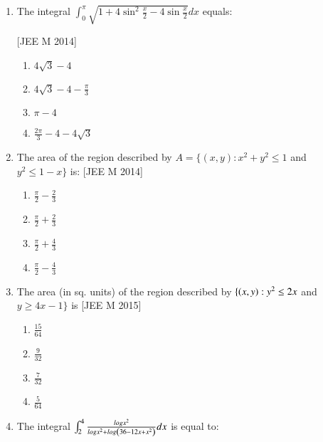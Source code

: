 \documentclass[journal,12pt,twocolumn]{IEEEtran}
\theoremstyle{remark}
\begin{document}
\begin{enumerate}[label=\textcolor{black}{\arabic*.}]

	\item The integral $\int_0^{\pi}\sqrt{1+4\sin ^2\frac{x}{2}-4\sin \frac{x}{2}}dx$ equals:

		\hfill{[JEE M 2014]}

		\begin{multicols}{2}
			\begin{enumerate}[label=(\alph*)]
				\item $4\sqrt{3}-4$
				\item $4\sqrt{3}-4-\frac{\pi}{3}$
				\item $\pi-4$
				\item $\frac{2\pi}{3}-4-4\sqrt{3}$
			\end{enumerate}
		\end{multicols}


	\item The area of the region described by $A=\{(x,y):x^2+y^2\leq1$ and $y^2\leq1-x\}$ is:
		\hfill{[JEE M 2014]}

		\begin{multicols}{4}
			\begin{enumerate}[label=(\alph*)]
				\item $\frac{\pi}{2}-\frac{2}{3}$
				\item $\frac{\pi}{2}+\frac{2}{3}$
				\item $\frac{\pi}{2}+\frac{4}{3}$
				\item $\frac{\pi}{2}-\frac{4}{3}$
			\end{enumerate}
		\end{multicols}


	\item The area (in sq. units) of the region described by $\{\left(x,y\right):y^2\leq2x$ and $y\geq4x-1\}$ is
		\hfill{[JEE M 2015]}

		\begin{multicols}{4}
			\begin{enumerate}[label=(\alph*)]
				\item $\frac{15}{64}$
				\item $\frac{9}{32}$
				\item $\frac{7}{32}$
				\item $\frac{5}{64}$
			\end{enumerate}
		\end{multicols}


	\item The integral $\int_2^4\frac{log x^2}{log x^2 + log\left(36-12x+x^2\right)}dx$ is equal to:


\end{enumerate}
\end{document}
